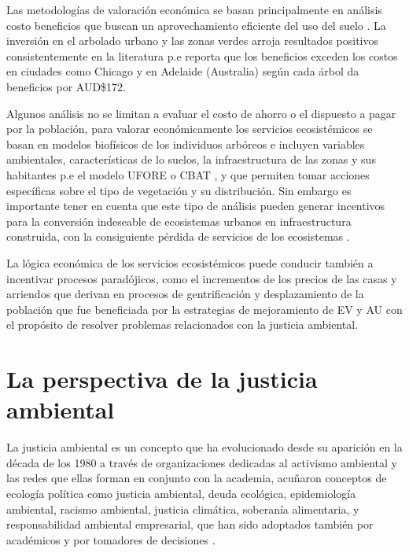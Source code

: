 \documentclass[12pt,]{book}
\begin{document}
Las metodologías de valoración económica se basan principalmente en
análisis costo beneficios que buscan un aprovechamiento eficiente del
uso del suelo \citep{bolund_ecosystem_1999}. La inversión en el arbolado
urbano y las zonas verdes arroja resultados positivos consistentemente
en la literatura p.e \citep{mcpherson_quantifying_1997} reporta que los
beneficios exceden los costos en ciudades como Chicago y en Adelaide
(Australia) según \citep{killicoat_economic_2002} cada árbol da
beneficios por AUD\$172.

Algunos análisis no se limitan a evaluar el costo de ahorro o el
dispuesto a pagar por la población, para valorar económicamente los
servicios ecosistémicos se basan en modelos biofísicos de los individuos
arbóreos e incluyen variables ambientales, características de lo suelos,
la infraestructura de las zonas y sus habitantes
\citep{nelson_modeling_2009} p.e el modelo UFORE
\citep{nowak_urban_2000} o CBAT \citep{mcpherson_quantifying_1997} , y
que permiten tomar acciones específicas sobre el tipo de vegetación y su
distribución. Sin embargo es importante tener en cuenta que este tipo de
análisis pueden generar incentivos para la conversión indeseable de
ecosistemas urbanos en infraestructura construida, con la consiguiente
pérdida de servicios de los ecosistemas
\citep{gomez-baggethun_classifying_2013}.

La lógica económica de los servicios ecosistémicos puede conducir
también a incentivar procesos paradójicos, como el incrementos de los
precios de las casas y arriendos que derivan en procesos de
gentrificación y desplazamiento de la población que fue beneficiada por
la estrategias de mejoramiento de EV y AU con el propósito de resolver
problemas relacionados con la justicia ambiental.
\citep{wolch_urban_2014}

\section{La perspectiva de la justicia
ambiental}\label{la-perspectiva-de-la-justicia-ambiental}

La justicia ambiental es un concepto que ha evolucionado desde su
aparición en la década de los 1980 a través de organizaciones dedicadas
al activismo ambiental y las redes que ellas forman en conjunto con la
academia, acuñaron conceptos de ecología política como justicia
ambiental, deuda ecológica, epidemiología ambiental, racismo ambiental,
justicia climática, soberanía alimentaria, y responsabilidad ambiental
empresarial, que han sido adoptados también por académicos y por
tomadores de decisiones
\citep{martinez_alier_between_2014, cerda_origen_2011}.
\end{document}
